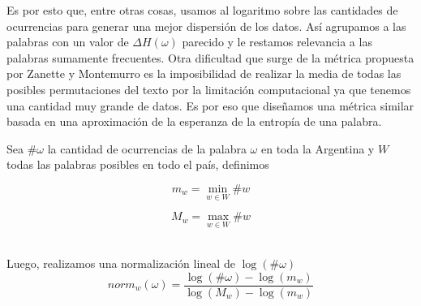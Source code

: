 Es por esto que, entre otras cosas, usamos al logaritmo sobre las cantidades de ocurrencias para generar una mejor dispersión de los datos. Así agrupamos a las palabras con un valor de $\Delta H(\omega)$ parecido y le restamos relevancia a las palabras sumamente frecuentes. Otra dificultad que surge de la métrica propuesta por Zanette y Montemurro es la imposibilidad de realizar la media de todas las posibles permutaciones del texto por la limitación computacional ya que 
tenemos una cantidad muy grande de datos. Es por eso que diseñamos una métrica similar basada en una aproximación de la esperanza de la entropía de una palabra.


Sea $\# \omega$ la cantidad de ocurrencias de la palabra $\omega$ en toda la Argentina y $W$ todas las palabras posibles en todo el país, definimos


\noindent\begin{minipage}{.5\linewidth}
\begin{equation}
  m_w = \min \limits_{w \in W} \# w
\end{equation}
\end{minipage}%
\begin{minipage}{.5\linewidth}
\begin{equation}
  M_w = \max \limits_{w \in W} \# w
\end{equation}
\end{minipage}\\

Luego, realizamos una normalización lineal de $\log(\# \omega)$ 
\begin{equation}
  norm_w(\omega) = \frac{\log \left(\# \omega\right) - \log \left(m_w\right)}{\log \left(M_w\right) -\log \left(m_w\right)}
\end{equation}



